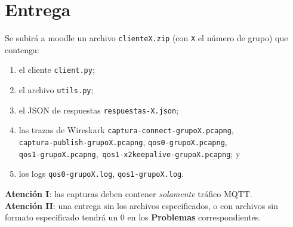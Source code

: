 \documentclass{upmassignment}
\begin{document}
\section*{Entrega}
\noindent Se subirá a moodle un archivo
\texttt{clienteX.zip}
(con \texttt{X} el número de grupo)
que contenga:
\begin{enumerate}
    \item el cliente \texttt{client.py};
    \item el archivo \texttt{utils.py};
    \item el JSON de respuestas \texttt{respuestas-X.json};
    \item las trazas de Wireskark
        \texttt{captura-connect-grupoX.pcapng},\\
        \texttt{captura-publish-grupoX.pcapng},
        \texttt{qos0-grupoX.pcapng},\\
        \texttt{qos1-grupoX.pcapng},\
        \texttt{qos1-x2keepalive-grupoX.pcapng}; y
    \item los logs
        \texttt{qos0-grupoX.log},
        \texttt{qos1-grupoX.log}.
\end{enumerate}

\begin{tcolorbox}
    \textbf{Atención I}: las capturas
    deben contener
    \emph{solamente} tráfico MQTT.\\
    \textbf{Atención II}: una entrega
    sin los archivos especificados,
    o con archivos sin formato especificado
    tendrá un 0 en los \textbf{Problemas}
    correspondientes.
\end{tcolorbox}
\end{document}
